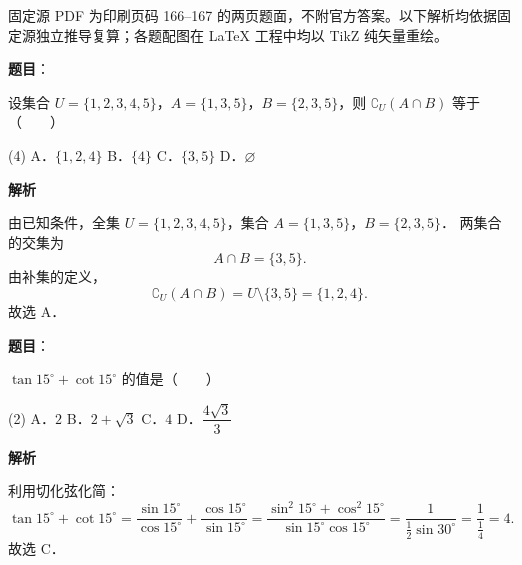 

\begin{gktip}
固定源 PDF 为印刷页码 166–167 的两页题面，不附官方答案。以下解析均依据固定源独立推导复算；各题配图在 LaTeX 工程中均以 TikZ 纯矢量重绘。
\end{gktip}

\begin{answer}

\textbf{题目}：

设集合 $U = \{1, 2, 3, 4, 5\}$，$A = \{1, 3, 5\}$，$B = \{2, 3, 5\}$，则 $\complement_U (A \cap B)$ 等于\mbox{（　　）}

\begin{gkopts}(4)
\task A．$\{1, 2, 4\}$
\task B．$\{4\}$
\task C．$\{3, 5\}$
\task D．$\varnothing$
\end{gkopts}

\textbf{解析}

由已知条件，全集 $U = \{1, 2, 3, 4, 5\}$，集合 $A = \{1, 3, 5\}$，$B = \{2, 3, 5\}$．
两集合的交集为
\nopagebreak[4]
\[
A \cap B = \{3, 5\}.
\]
由补集的定义，
\nopagebreak[4]
\[
\complement_U (A \cap B) = U \setminus \{3, 5\} = \{1, 2, 4\}.
\]
故选 A．


\end{answer}
\begin{answer}

\textbf{题目}：

$\tan 15^\circ + \cot 15^\circ$ 的值是\mbox{（　　）}

\begin{gkopts}(2)
\task A．$2$
\task B．$2 + \sqrt{3}$
\task C．$4$
\task D．$\dfrac{4\sqrt{3}}{3}$
\end{gkopts}

\textbf{解析}

利用切化弦化简：
\nopagebreak[4]
\[
\tan 15^\circ + \cot 15^\circ = \frac{\sin 15^\circ}{\cos 15^\circ} + \frac{\cos 15^\circ}{\sin 15^\circ} = \frac{\sin^2 15^\circ + \cos^2 15^\circ}{\sin 15^\circ \cos 15^\circ} = \frac{1}{\frac{1}{2}\sin 30^\circ} = \frac{1}{\frac{1}{4}} = 4.
\]
故选 C．


\end{answer}
